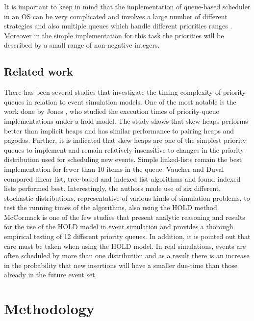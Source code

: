 \documentclass{article}
\begin{document}
It is important to keep in mind that the implementation of queue-based scheduler in an OS can be very complicated and involves a large number of different strategies and also multiple queues which handle different priorities ranges \cite{arzen2000introduction}.\\
Moreover in the simple implementation for this task the priorities will be described by a small range of non-negative integers.

\pagebreak

\subsection{Related work}
There has been several studies that investigate the timing complexity of priority queues in relation to event simulation models. One of the most notable is the work done by Jones \cite{Jones}, who studied the execution times of priority-queue implementations under a hold model. The study shows that skew heaps performs better than implicit heaps and has similar performance to pairing heaps and pagodas. Further, it is indicated that skew heaps are one of the simplest priority queues to implement and remain relatively insensitive to changes in the priority distribution used for scheduling new events. Simple linked-lists remain the best implementation for fewer than 10 items in the queue. Vaucher and Duval \cite{vaucher} compared linear list, tree-based and indexed list algorithms and found indexed lists performed best. Interestingly, the authors made use of six different, stochastic distributions, representative of various kinds of simulation problems, to test the running times of the algorithms, also using the HOLD method. McCormack \cite{McCormack} is one of the few studies that present analytic reasoning and results for the use of the HOLD model in event simulation and provides a thorough empirical testing of 12 different priority queues. In addition, it is pointed out that care must be taken when using the HOLD model. In real simulations, events are often scheduled by more than one distribution and as a result there is an increase in the probability that new insertions will have a smaller due-time than those already in the future event set.

\pagebreak



\section{Methodology}
\end{document}
